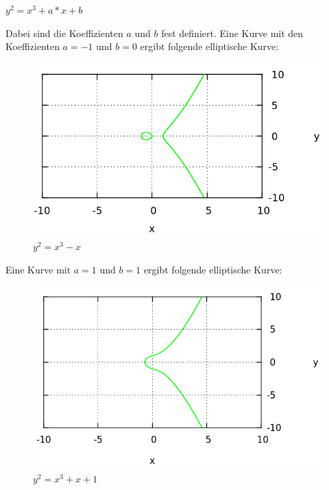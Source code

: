 \begin{center}
$y^2 = x^3 + a*x + b$
\end{center}

Dabei sind die Koeffizienten $a$ und $b$ fest definiert.
Eine Kurve mit den Koeffizienten $a = -1$ und $b = 0$ ergibt folgende elliptische Kurve:

\begin{figure}[H]
	\begin{center}
		\includegraphics[keepaspectratio=true, scale=0.4]{./pictures/example_curve_1a.png}
	\end{center}
	\caption{$y^2 = x^3 -x$}\label{example_1}
\end{figure}

Eine Kurve mit $a = 1$ und $b = 1$ ergibt folgende elliptische Kurve:

\begin{figure}[H]
	\begin{center}
		\includegraphics[keepaspectratio=true, scale=0.4]{./pictures/example_curve_2a.png}
	\end{center}
	\caption{$y^2 = x^3 +x +1$}\label{example_2}
\end{figure}

